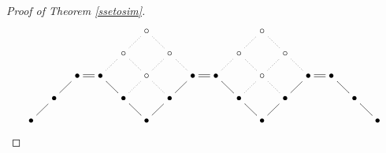 \documentclass{amsart}
\theoremstyle{definition}
\theoremstyle{remark}
\numberwithin{equation}{section}
\begin{document}
{{\begin{proof}[Proof of Theorem 
\ref{ssetosim}]
\begin{equation}
\xymatrix@=10pt{
    &                        &                            &                 &                              & 
 \circ \ar@{.}[dl]\ar@{.}[dr] &  &                 &                 &                                 & 
 \circ \ar@{.}[dl]\ar@{.}[dr] & &                 &                 &                & \\
    &                        &                            &                 & \circ \ar@{.}[dl]\ar@{.}[dr] & 
    & \circ \ar@{.}[dl]\ar@{.}[dr]  &                 &                 & \circ \ar@{.}[dl]\ar@{.}[dr] & 
    & \circ \ar@{.}[dl]\ar@{.}[dr]  &                 &                 &                & \\
    &                        & \bullet \ar@{-}[dl] \ar@{=}[r] & \bullet \ar@{-}[dr] &                & \circ \ar@{.}[dl]\ar@{.}[dr]
    &                        & \bullet  \ar@{-}[dl] \ar@{=}[r] & \bullet \ar@{-}[dr] &                &  \circ \ar@{.}[dl]\ar@{.}[dr]
    &                        & \bullet  \ar@{-}[dl] \ar@{=}[r] & \bullet \ar@{-}[dr] &                & \\
    & \bullet        \ar@{-}[dl] &                             &               & \bullet \ar@{-}[dr] &  
    & \bullet        \ar@{-}[dl] &                             &               & \bullet \ar@{-}[dr] &  
    & \bullet        \ar@{-}[dl] &                             &               & \bullet \ar@{-}[dr] &  \\
 \bullet &                    &                             &               &                 &   \bullet
         &                    &                             &               &                 &   \bullet 
          &                    &                             &               &                 &   \bullet 
}
\end{equation} 


\end{proof}}}
\end{document}
